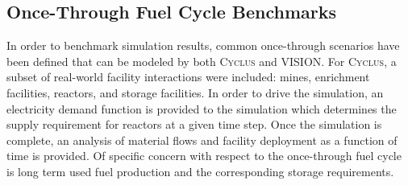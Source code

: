 \documentclass{anstrans}
\begin{document}
\subsection{Once-Through Fuel Cycle Benchmarks}
In order to benchmark simulation results, common once-through
scenarios have been defined that can be modeled by both \textsc{Cyclus}
and VISION.  For \textsc{Cyclus}, a subset of real-world facility
interactions were included: mines, enrichment facilities, reactors,
and storage facilities. In order to drive the simulation, an
electricity demand function is provided to the simulation which
determines the supply requirement for reactors at a given time
step. Once the simulation is complete, an analysis of material flows
and facility deployment as a function of time is provided. Of specific
concern with respect to the once-through fuel cycle is long term used
fuel production and the corresponding storage requirements.

\end{document}
